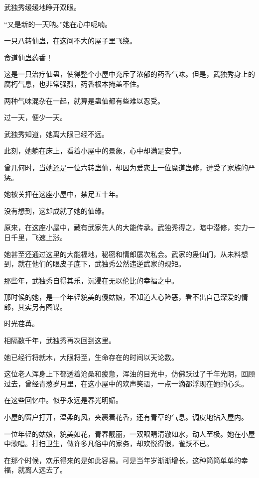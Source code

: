 
\begin{this_body}

武独秀缓缓地睁开双眼。

“又是新的一天呐。”她在心中呢喃。

一只八转仙蛊，在这间不大的屋子里飞绕。

食道仙蛊药香！

这是一只治疗仙蛊，使得整个小屋中充斥了浓郁的药香气味。但是，武独秀身上的腐朽气息，也非常强烈，药香根本掩盖不住。

两种气味混杂在一起，就算是蛊仙都有些难以忍受。

过一天，便少一天。

武独秀知道，她离大限已经不远。

此刻，她躺在床上，看着小屋中的景象，心中却满是安宁。

曾几何时，当她还是一位六转蛊仙，却因为爱恋上一位魔道蛊修，遭受了家族的严惩。

她被关押在这座小屋中，禁足五十年。

没有想到，这却成就了她的仙缘。

原来，在这座小屋中，藏有武家先人的大能传承。武独秀得之，暗中潜修，实力一日千里，飞速上涨。

她甚至还通过这里的大能福地，秘密和情郎屡次私会。武家的蛊仙们，从未料想到，就在他们的眼皮子底下，武独秀公然违逆武家的规矩。

那些年，武独秀自得其乐，沉浸在无以伦比的幸福之中。

那时候的她，是一个年轻貌美的傻姑娘，不知道人心险恶，看不出自己深爱的情郎，其实另有图谋。

时光荏苒。

相隔数千年，武独秀再次回到这里。

她已经行将就木，大限将至，生命存在的时间以天论数。

这位老人浑身上下都透着沧桑和疲惫，浑浊的目光中，仿佛跃过了千年光阴，回顾过去，曾经青葱岁月里，在这小屋中的欢声笑语，一点一滴都浮现在她的心头。

在这些回忆中。似乎永远是春光明媚。

小屋的窗户打开，温柔的风，夹裹着花香，还有青草的气息。调皮地钻入屋内。

一位年轻的姑娘，貌美如花，青春靓丽，一双眼睛清澈如水，动人至极。她在小屋中歌唱。打扫卫生，做许多凡俗中的家务，却欢悦得很，雀跃不已。

在那个时候，欢乐得来的是如此容易。可是当年岁渐渐增长，这种简简单单的幸福，就离人远去了。


\end{this_body}
